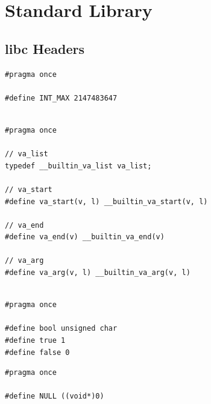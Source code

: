 \documentclass[../main.tex]{subfiles}
\begin{document}
\section{Standard Library}
\label{apx:standard_library}


\subsection{libc Headers}
\label{apx:libc_headers}


\label{lst:limits_h}
\begin{verbatim}
#pragma once

#define INT_MAX 2147483647


\end{verbatim}


\label{lst:stdarg_h}
\begin{verbatim}
#pragma once

// va_list
typedef __builtin_va_list va_list;

// va_start
#define va_start(v, l) __builtin_va_start(v, l)

// va_end
#define va_end(v) __builtin_va_end(v)

// va_arg
#define va_arg(v, l) __builtin_va_arg(v, l)


\end{verbatim}


\label{lst:stdbool_h}
\begin{verbatim}
#pragma once 

#define bool unsigned char
#define true 1
#define false 0

\end{verbatim}


\label{lst:stddef_h}
\begin{verbatim}
#pragma once

#define NULL ((void*)0)
\end{verbatim}
\end{document}
